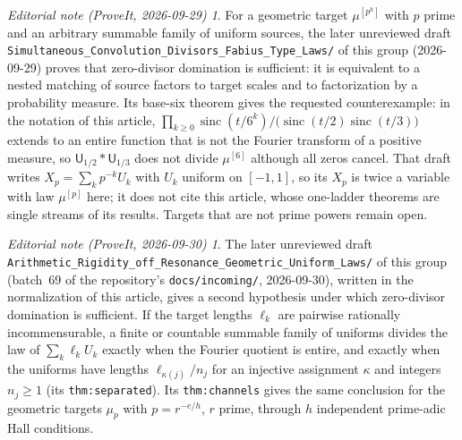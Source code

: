\documentclass[11pt,a4paper]{article}
\theoremstyle{definition}
\theoremstyle{remark}
\newtheorem*{ednote}{Editorial note (ProveIt, 2026-09-29)}
\newtheorem*{ednotelater}{Editorial note (ProveIt, 2026-09-30)}
\newcommand{\sinc}{\operatorname{sinc}}
\newcommand{\Unif}{\mathsf U}
\newcommand{\Mu}[1]{\mu^{[#1]}}
\begin{document}
\begin{ednote}
For a geometric target $\Mu{p^h}$ with $p$ prime and an arbitrary summable
family of uniform sources, the later unreviewed draft
\nolinkurl{Simultaneous_Convolution_Divisors_Fabius_Type_Laws/} of this
group (2026-09-29) proves that zero-divisor domination is sufficient: it is
equivalent to a nested matching of source factors to target scales and to
factorization by a probability measure. Its base-six theorem gives the
requested counterexample: in the notation of this article,
$\prod_{k\ge0}\sinc(t/6^k)\big/\bigl(\sinc(t/2)\sinc(t/3)\bigr)$ extends to
an entire function that is not the Fourier transform of a positive
measure, so $\Unif_{1/2}*\Unif_{1/3}$ does not divide $\Mu{6}$ although
all zeros cancel. That draft writes $X_p=\sum_k p^{-k}U_k$ with $U_k$
uniform on $[-1,1]$, so its $X_p$ is twice a variable with law $\Mu{p}$
here; it does not cite this article, whose one-ladder theorems are single
streams of its results. Targets that are not prime powers remain open.
\end{ednote}
\begin{ednotelater}
The later unreviewed draft
\nolinkurl{Arithmetic_Rigidity_off_Resonance_Geometric_Uniform_Laws/} of
this group (batch~69 of the repository's \nolinkurl{docs/incoming/},
2026-09-30), written in the normalization of this article, gives a second
hypothesis under which zero-divisor domination is sufficient. If the target
lengths $\ell_k$ are pairwise rationally incommensurable, a finite or
countable summable family of uniforms divides the law of
$\sum_k\ell_kU_k$ exactly when the Fourier quotient is entire, and exactly
when the uniforms have lengths $\ell_{\kappa(j)}/n_j$ for an injective
assignment $\kappa$ and integers $n_j\ge1$ (its \texttt{thm:separated}).
Its \texttt{thm:channels} gives the same conclusion for the geometric
targets $\mu_p$ with $p=r^{-e/h}$, $r$ prime, through $h$ independent
prime-adic Hall conditions.
\end{ednotelater}
\end{document}
